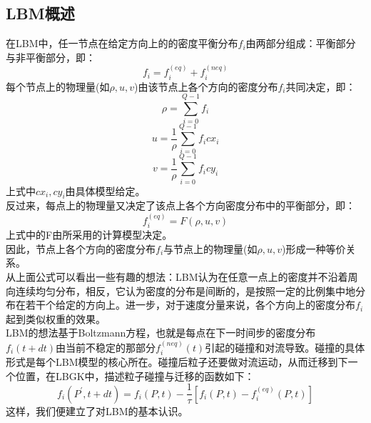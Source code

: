 \documentclass[UTF8]{ctexart}
\begin{document}
\subsection{LBM概述}
\indent 在LBM中，任一节点在给定方向上的的密度平衡分布$f_i$由两部分组成：平衡部分与非平衡部分，即：
\begin{equation}
f_i=f_i^{(eq)}+f_i^{(neq)} 
\end{equation}
\indent 每个节点上的物理量(如$\rho,u,v$)由该节点上各个方向的密度分布$f_i$共同决定，即：
\begin{equation}
 \rho= \sum_{i=0}^{Q-1}f_i 
\end{equation}
\begin{equation} 
u= \frac{1}{\rho}\sum_{i=0}^{Q-1}{f_i cx_i} 
\end{equation}
\begin{equation} 
v= \frac{1}{\rho}\sum_{i=0}^{Q-1}{f_i cy_i}
\end{equation}
\indent 上式中$cx_i,cy_i$由具体模型给定。\\
\indent 反过来，每点上的物理量又决定了该点上各个方向密度分布中的平衡部分，即：
\begin{equation} 
f_i^{(eq)} = F(\rho,u,v)
\end{equation}
\indent 上式中的F由所采用的计算模型决定。\\
\indent 因此，节点上各个方向的密度分布$f_i$与节点上的物理量(如$\rho,u,v$)形成一种等价关系。\\
\indent 从上面公式可以看出一些有趣的想法：LBM认为在任意一点上的密度并不沿着周向连续均匀分布，相反，它认为密度的分布是间断的，是按照一定的比例集中地分布在若干个给定的方向上。进一步，对于速度分量来说，各个方向上的密度分布$f_i$起到类似权重的效果。\\
\indent LBM的想法基于Boltzmann方程，也就是每点在下一时间步的密度分布$f_i(t+dt)$由当前不稳定的那部分$f_i^{(neq)}(t)$引起的碰撞和对流导致。碰撞的具体形式是每个LBM模型的核心所在。碰撞后粒子还要做对流运动，从而迁移到下一个位置，在LBGK中，描述粒子碰撞与迁移的函数如下：
\begin{equation} 
 f_i(P^\prime,t+dt)=f_i(P,t)-\frac{1}{\tau}[f_i(P,t)-f_i^{(eq)}(P,t)] 
\end{equation}
\indent 这样，我们便建立了对LBM的基本认识。
\end{document}
